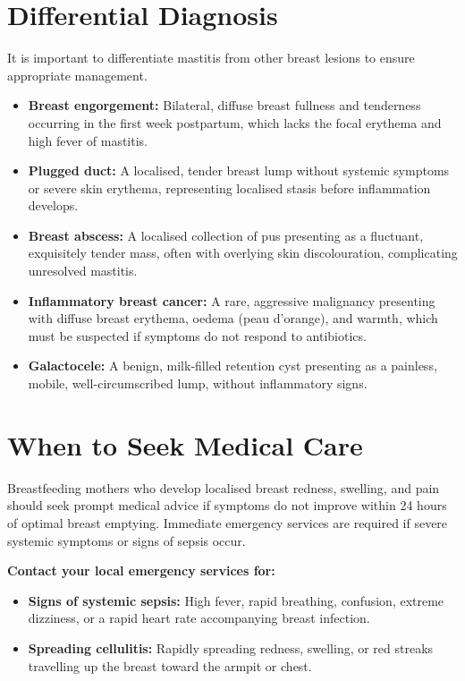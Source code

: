 \section*{Differential Diagnosis}
It is important to differentiate mastitis from other breast lesions to ensure appropriate management.
\begin{itemize}
    \item \textbf{Breast engorgement:} Bilateral, diffuse breast fullness and tenderness occurring in the first week postpartum, which lacks the focal erythema and high fever of mastitis.
    \item \textbf{Plugged duct:} A localised, tender breast lump without systemic symptoms or severe skin erythema, representing localised stasis before inflammation develops.
    \item \textbf{Breast abscess:} A localised collection of pus presenting as a fluctuant, exquisitely tender mass, often with overlying skin discolouration, complicating unresolved mastitis.
    \item \textbf{Inflammatory breast cancer:} A rare, aggressive malignancy presenting with diffuse breast erythema, oedema (peau d'orange), and warmth, which must be suspected if symptoms do not respond to antibiotics.
    \item \textbf{Galactocele:} A benign, milk-filled retention cyst presenting as a painless, mobile, well-circumscribed lump, without inflammatory signs.
\end{itemize}

\section*{When to Seek Medical Care}
Breastfeeding mothers who develop localised breast redness, swelling, and pain should seek prompt medical advice if symptoms do not improve within 24 hours of optimal breast emptying. Immediate emergency services are required if severe systemic symptoms or signs of sepsis occur.

\textbf{Contact your local emergency services for:}
\begin{itemize}
    \item \textbf{Signs of systemic sepsis:} High fever, rapid breathing, confusion, extreme dizziness, or a rapid heart rate accompanying breast infection.
    \item \textbf{Spreading cellulitis:} Rapidly spreading redness, swelling, or red streaks travelling up the breast toward the armpit or chest.
\end{itemize}

